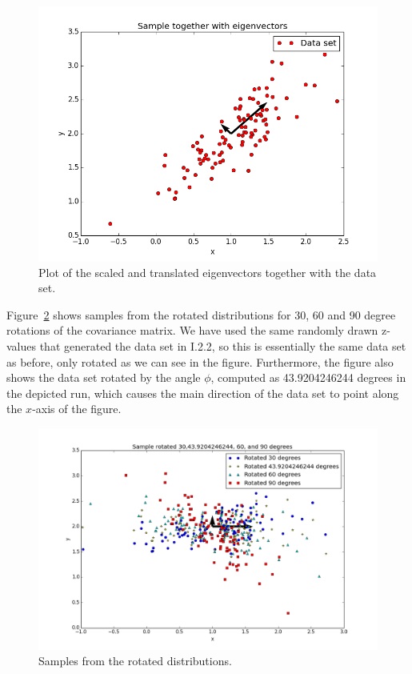 \documentclass[a4paper]{article}
\begin{document}
\begin{figure}[H]
  \centering
  \includegraphics[width=.6\linewidth]{figures/samples_with_eigenvectors.png}
  \caption{Plot of the scaled and translated eigenvectors together with the data set.}
  \label{fig:samples_with_eigenvectors}
\end{figure}

Figure~\ref{fig:samples_rotated} shows samples from the rotated distributions for 30, 60 and 90 degree rotations of the covariance matrix. We have used the same randomly drawn z-values that generated the data set in I.2.2, so this is essentially the same data set as before, only rotated as we can see in the figure. Furthermore, the figure also shows the data set rotated by the angle $\phi$, computed as 43.9204246244 degrees in the depicted run, which causes the main direction of the data set to point along the $x$-axis of the figure. 


\begin{figure}[H]
  \centering
  \includegraphics[width=1\linewidth]{figures/samples_rotated.png}
  \caption{Samples from the rotated distributions.}
  \label{fig:samples_rotated}
\end{figure}
\end{document}
